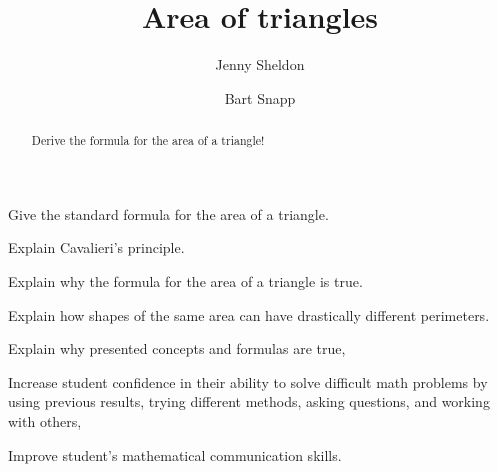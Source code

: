 \documentclass[nooutcomes,noauthor,handout]{../ximera}
\title{Area of triangles}
\author{Jenny Sheldon \and Bart Snapp}
\begin{document}
\begin{abstract}
  Derive the formula for the area of a triangle!
\end{abstract}
\maketitle


\begin{listOutcomes}
\item Give the standard formula for the area of a triangle.
\item Explain Cavalieri's principle.
\item Explain why the formula for the area of a triangle is true.
\item Explain how shapes of the same area can have drastically
  different perimeters.
\end{listOutcomes}

\begin{listObjectives}
 \item Explain why presented concepts and formulas are true,
 \item Increase student confidence in their ability to solve difficult math problems by using previous results, trying different methods, asking questions, and working with others,
 \item Improve student’s mathematical communication skills.

\end{listObjectives}

\mynewpage
\end{document}
